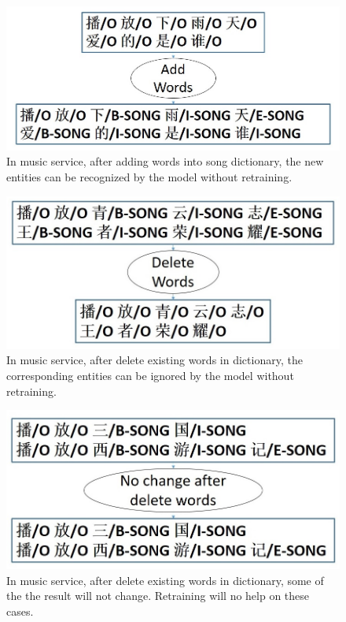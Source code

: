 \documentclass[letterpaper]{article} %
\begin{document}
\begin{figure}[t]
\centering
\includegraphics[width=0.8\columnwidth]{change_after_adding_song} %
\caption{In music service, after adding words into song dictionary, the new entities can be recognized by the model without retraining.}
\label{fig3}
\end{figure}

\begin{figure}[t]
\centering
\includegraphics[width=0.75\columnwidth]{change_after_delete_song} %
\caption{In music service, after delete existing words in dictionary, the corresponding entities can be ignored by the model without retraining.}
\label{fig4}
\end{figure}

\begin{figure}[t]
\centering
\includegraphics[width=0.8\columnwidth]{no_change_after_delete_song} %
\caption{In music service, after delete existing words in dictionary, some of the the result will not change. Retraining will no help on these cases.}
\label{fig5}
\end{figure}
\end{document}
